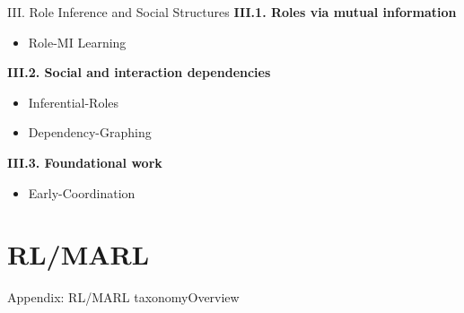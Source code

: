 \begin{frame}{III. Role Inference and Social Structures}
    \small
    \textbf{III.1. Roles via mutual information}
    \begin{itemize}
        \item Role-MI Learning~\cite{Wang2020}
    \end{itemize}

    \vspace{2mm}
    \textbf{III.2. Social and interaction dependencies}
    \begin{itemize}
        \item Inferential-Roles~\cite{yusuf2020inferential}
        \item Dependency-Graphing~\cite{serrino2019finding}
    \end{itemize}

    \vspace{2mm}
    \textbf{III.3. Foundational work}
    \begin{itemize}
        \item Early-Coordination~\cite{berenji2000learning}
    \end{itemize}
\end{frame}

\section{RL/MARL}

\begin{frame}
    {Appendix: RL/MARL taxonomy}{Overview}

    \begin{figure}
        \centering
        \resizebox{1\linewidth}{!}{
            
        }
    \end{figure}
\end{frame}


